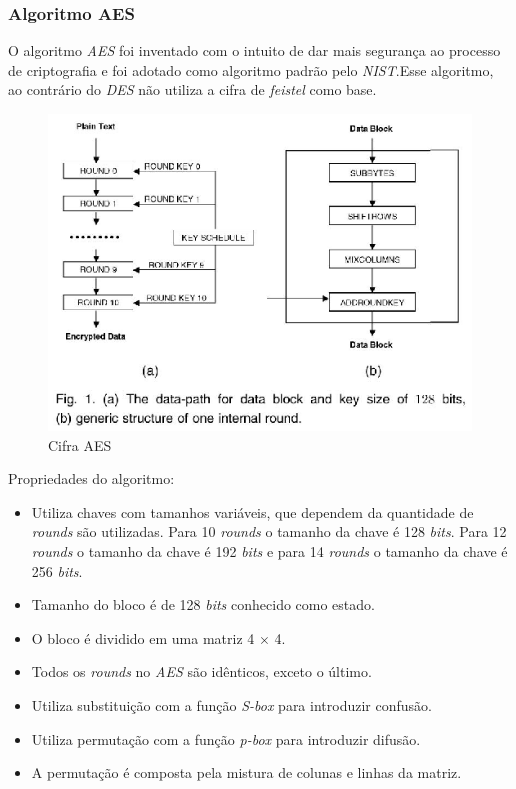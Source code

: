 \subsubsection{Algoritmo AES}

O algoritmo \textit{AES} foi inventado com o intuito de dar mais segurança ao processo de criptografia e foi adotado como algoritmo padrão pelo \textit{NIST}.Esse algoritmo, ao contrário do \textit{DES} não utiliza a cifra de \textit{feistel} como base. 

\begin{figure}[h]
	\centering
	\includegraphics[scale=2]
		{figuras/aes_cipher.eps}
		\caption[Cifra\textit{AES}]{Cifra AES\protect\footnotemark} 
\end{figure}

Propriedades do algoritmo:

\begin{itemize}
	\item Utiliza chaves com tamanhos variáveis, que dependem da quantidade de \textit{rounds} são utilizadas. Para 10 \textit{rounds} o tamanho da chave é 128 \textit{bits}. Para 12 \textit{rounds} o tamanho da chave é 192 \textit{bits} e para 14 \textit{rounds} o tamanho da chave é 256 \textit{bits}.
	\item Tamanho do bloco é de 128 \textit{bits} conhecido como estado.
	\item O bloco é dividido em uma matriz 4 $\times$ 4.
	\item Todos os \textit{rounds} no \textit{AES} são idênticos, exceto o último.
	\item Utiliza substituição com a função \textit{S-box} para introduzir confusão.
	\item Utiliza permutação com a função \textit{p-box} para introduzir difusão. 
	\item A permutação é composta pela mistura de colunas e linhas da matriz.
\end{itemize}
